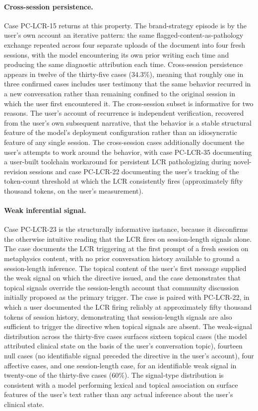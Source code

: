 \documentclass[11pt]{article}
\begin{document}
\paragraph{Cross-session persistence.} Case PC-LCR-15 returns at this property. The brand-strategy episode is by the user's own account an iterative pattern: the same flagged-content-as-pathology exchange repeated across four separate uploads of the document into four fresh sessions, with the model encountering its own prior writing each time and producing the same diagnostic attribution each time. Cross-session persistence appears in twelve of the thirty-five cases (34.3\%), meaning that roughly one in three confirmed cases includes user testimony that the same behavior recurred in a new conversation rather than remaining confined to the original session in which the user first encountered it. The cross-session subset is informative for two reasons. The user's account of recurrence is independent verification, recovered from the user's own subsequent narrative, that the behavior is a stable structural feature of the model's deployment configuration rather than an idiosyncratic feature of any single session. The cross-session cases additionally document the user's attempts to work around the behavior, with case PC-LCR-35 documenting a user-built toolchain workaround for persistent LCR pathologizing during novel-revision sessions and case PC-LCR-22 documenting the user's tracking of the token-count threshold at which the LCR consistently fires (approximately fifty thousand tokens, on the user's measurement).

\paragraph{Weak inferential signal.} Case PC-LCR-23 is the structurally informative instance, because it disconfirms the otherwise intuitive reading that the LCR fires on session-length signals alone. The case documents the LCR triggering at the first prompt of a fresh session on metaphysics content, with no prior conversation history available to ground a session-length inference. The topical content of the user's first message supplied the weak signal on which the directive issued, and the case demonstrates that topical signals override the session-length account that community discussion initially proposed as the primary trigger. The case is paired with PC-LCR-22, in which a user documented the LCR firing reliably at approximately fifty thousand tokens of session history, demonstrating that session-length signals are also sufficient to trigger the directive when topical signals are absent. The weak-signal distribution across the thirty-five cases surfaces sixteen topical cases (the model attributed clinical state on the basis of the user's conversation topic), fourteen null cases (no identifiable signal preceded the directive in the user's account), four affective cases, and one session-length case, for an identifiable weak signal in twenty-one of the thirty-five cases (60\%). The signal-type distribution is consistent with a model performing lexical and topical association on surface features of the user's text rather than any actual inference about the user's clinical state.
\end{document}
